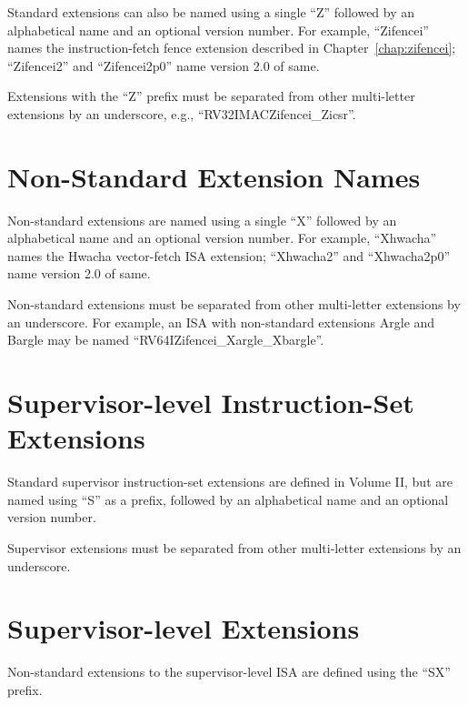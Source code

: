 Standard extensions can also be named using a single ``Z'' followed by an
alphabetical name and an optional version number.  For example,
``Zifencei'' names the instruction-fetch fence extension described in
Chapter~\ref{chap:zifencei}; ``Zifencei2'' and ``Zifencei2p0'' name version
2.0 of same.

Extensions with the ``Z'' prefix must be separated
from other multi-letter extensions by an underscore, e.g.,
``RV32IMACZifencei\_Zicsr''.

\section{Non-Standard Extension Names}

Non-standard extensions are named using a single ``X'' followed by an
alphabetical name and an optional version number.
For example, ``Xhwacha'' names the Hwacha vector-fetch ISA extension;
``Xhwacha2'' and ``Xhwacha2p0'' name version 2.0 of same.

Non-standard extensions must be separated from other multi-letter extensions
by an underscore.  For example, an ISA with non-standard extensions
Argle and Bargle may be named ``RV64IZifencei\_Xargle\_Xbargle''.

\section{Supervisor-level Instruction-Set Extensions}
Standard supervisor instruction-set extensions are defined in Volume II, but
are named using ``S'' as a prefix, followed by an
alphabetical name and an optional version number.

Supervisor extensions must be separated from other multi-letter extensions
by an underscore.

\section{Supervisor-level Extensions}
Non-standard extensions to the supervisor-level ISA are defined using
the ``SX'' prefix.

